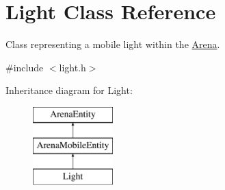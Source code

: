 \hypertarget{class_light}{}\section{Light Class Reference}
\label{class_light}


Class representing a mobile light within the \mbox{\hyperlink{class_arena}{Arena}}.  




{\ttfamily \#include $<$light.\+h$>$}

Inheritance diagram for Light\+:\begin{figure}[H]
\begin{center}
\leavevmode
\includegraphics[height=3.000000cm]{class_light}
\end{center}
\end{figure}
